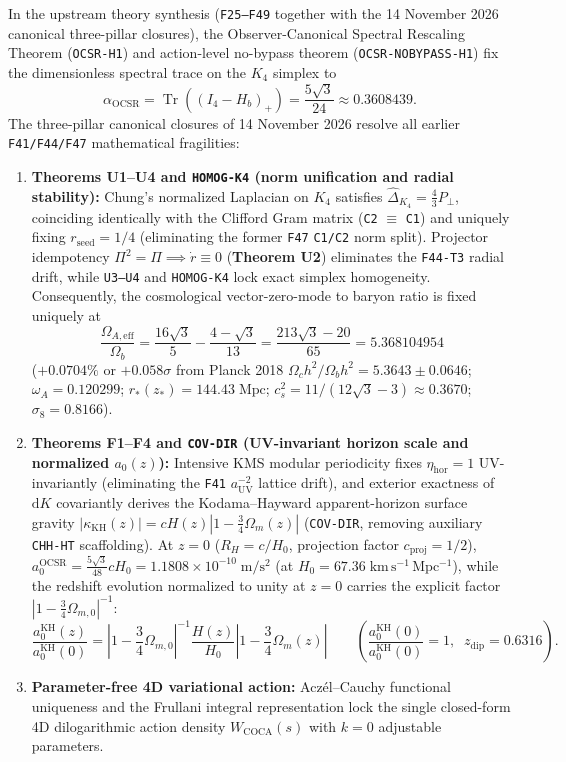 \documentclass[11pt]{article}
\begin{document}
In the upstream theory synthesis (\texttt{F25--F49} together with the 14
November 2026 canonical three-pillar closures), the Observer-Canonical Spectral
Rescaling Theorem (\texttt{OCSR-H1}) and action-level no-bypass theorem
(\texttt{OCSR-NOBYPASS-H1}) fix the dimensionless spectral trace on the $K_4$
simplex to
\[
\alpha_{\mathrm{OCSR}} = \operatorname{Tr}\!\left((I_4-H_b)_+\right) = \frac{5\sqrt{3}}{24} \approx 0.3608439.
\]
The three-pillar canonical closures of 14 November 2026 resolve all earlier
\texttt{F41/F44/F47} mathematical fragilities:
\begin{enumerate}[leftmargin=*]
\item \textbf{Theorems U1--U4 and \texttt{HOMOG-K4} (norm unification and radial stability):}
Chung's normalized Laplacian on $K_4$ satisfies
$\widehat{\Delta}_{K_4}=\frac{4}{3}P_\perp$, coinciding identically with the
Clifford Gram matrix (\texttt{C2} $\equiv$ \texttt{C1}) and uniquely fixing
$r_{\mathrm{seed}}=1/4$ (eliminating the former \texttt{F47} \texttt{C1/C2} norm
split). Projector idempotency $\Pi^2=\Pi\implies\dot{r}\equiv 0$ (\textbf{Theorem
U2}) eliminates the \texttt{F44-T3} radial drift, while \texttt{U3--U4} and
\texttt{HOMOG-K4} lock exact simplex homogeneity. Consequently, the cosmological
vector-zero-mode to baryon ratio is fixed uniquely at
\[
\frac{\Omega_{A,\mathrm{eff}}}{\Omega_b}
= \frac{16\sqrt{3}}{5} - \frac{4-\sqrt{3}}{13}
= \frac{213\sqrt{3}-20}{65}
= 5.368104954
\]
($+0.0704\%$ or $+0.058\sigma$ from Planck 2018
$\Omega_c h^2/\Omega_b h^2=5.3643\pm 0.0646$; $\omega_A=0.120299$;
$r_*(z_*)=144.43\;\mathrm{Mpc}$; $c_s^2=11/(12\sqrt{3}-3)\approx 0.3670$;
$\sigma_8=0.8166$).
\item \textbf{Theorems F1--F4 and \texttt{COV-DIR} (UV-invariant horizon scale and normalized $a_0(z)$):}
Intensive KMS modular periodicity fixes $\eta_{\mathrm{hor}}=1$ UV-invariantly
(eliminating the \texttt{F41} $a_{\mathrm{UV}}^{-2}$ lattice drift), and
exterior exactness of $\mathrm{d}K$ covariantly derives the Kodama--Hayward
apparent-horizon surface gravity
$|\kappa_{\mathrm{KH}}(z)|=cH(z)\left|1-\frac{3}{4}\Omega_m(z)\right|$
(\texttt{COV-DIR}, removing auxiliary \texttt{CHH-HT} scaffolding). At $z=0$
($R_H=c/H_0$, projection factor $c_{\mathrm{proj}}=1/2$),
$a_0^{\mathrm{OCSR}}=\frac{5\sqrt{3}}{48}cH_0=1.1808\times 10^{-10}\;\mathrm{m/s^2}$
(at $H_0=67.36\;\mathrm{km\,s^{-1}\,Mpc^{-1}}$), while the redshift evolution
normalized to unity at $z=0$ carries the explicit factor
$\left|1-\frac{3}{4}\Omega_{m,0}\right|^{-1}$:
\[
\frac{a_0^{\mathrm{KH}}(z)}{a_0^{\mathrm{KH}}(0)}
= \left|1-\frac{3}{4}\Omega_{m,0}\right|^{-1}
  \frac{H(z)}{H_0}\left|1-\frac{3}{4}\Omega_m(z)\right|
\qquad \left(\frac{a_0^{\mathrm{KH}}(0)}{a_0^{\mathrm{KH}}(0)}=1,\;\; z_{\mathrm{dip}}=0.6316\right).
\]
\item \textbf{Parameter-free 4D variational action:}
Acz\'el--Cauchy functional uniqueness and the Frullani integral representation
lock the single closed-form 4D dilogarithmic action density
$W_{\mathrm{COCA}}(s)$ with $k=0$ adjustable parameters.
\end{enumerate}
\end{document}
